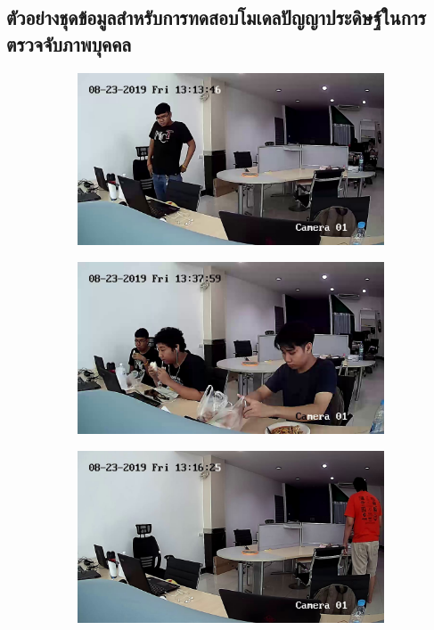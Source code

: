 \subsection*{ตัวอย่างชุดข้อมูลสำหรับการทดสอบโมเดลปัญญาประดิษฐ์ในการตรวจจับภาพบุคคล}
\begin{figure}[!ht]
    \centering
   \begin{subfigure}[b]{0.55\linewidth}
      \includegraphics[width=\linewidth]{appendix/images/3.jpg}
    \end{subfigure}
    \begin{subfigure}[b]{0.55\linewidth}
      \includegraphics[width=\linewidth]{appendix/images/5.jpg}
    \end{subfigure}
    \begin{subfigure}[b]{0.55\linewidth}
      \includegraphics[width=\linewidth]{appendix/images/8.jpg}

\end{subfigure}
\end{figure}
